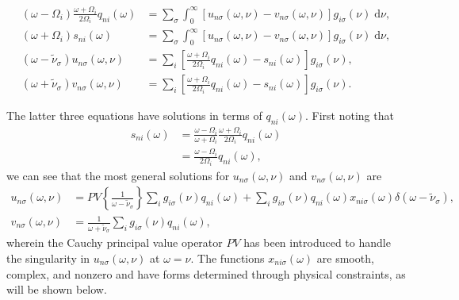 \begin{equation}\label{eq:hybridizationCoefficientsSystemManyModes}
\begin{split}
(\omega - \Omega_i)\frac{\omega + \Omega_i}{2\Omega_i}q_{ni}(\omega) &= \sum_\sigma\int_0^\infty\left[u_{n\sigma}(\omega,\nu) - v_{n\sigma}(\omega,\nu)\right]g_{i\sigma}(\nu)\;\mathrm{d}\nu,\\
(\omega + \Omega_i)s_{ni}(\omega) &= \sum_\sigma\int_0^\infty\left[u_{n\sigma}(\omega,\nu) - v_{n\sigma}(\omega,\nu)\right]g_{i\sigma}(\nu)\;\mathrm{d}\nu,\\
(\omega - \tilde{\nu}_\sigma)u_{n\sigma}(\omega,\nu) &= \sum_i\left[\frac{\omega + \Omega_i}{2\Omega_i}q_{ni}(\omega) - s_{ni}(\omega)\right]g_{i\sigma}(\nu),\\
(\omega + \tilde{\nu}_\sigma)v_{n\sigma}(\omega,\nu) &= \sum_i\left[\frac{\omega + \Omega_i}{2\Omega_i}q_{ni}(\omega) - s_{ni}(\omega)\right]g_{i\sigma}(\nu).
\end{split}
\end{equation}

The latter three equations have solutions in terms of $q_{ni}(\omega)$. First noting that
\begin{equation}
\begin{split}
s_{ni}(\omega) &= \frac{\omega - \Omega_i}{\omega + \Omega_i}\frac{\omega + \Omega_i}{2\Omega_i}q_{ni}(\omega)\\
&= \frac{\omega - \Omega_i}{2\Omega_i}q_{ni}(\omega),
\end{split}
\end{equation}
we can see that the most general solutions for $u_{n\sigma}(\omega,\nu)$ and $v_{n\sigma}(\omega,\nu)$ are
\begin{equation}
\begin{split}
u_{n\sigma}(\omega,\nu) &= PV\left\{\frac{1}{\omega - \tilde{\nu}_\sigma}\right\}\sum_ig_{i\sigma}(\nu)q_{ni}(\omega) + \sum_ig_{i\sigma}(\nu)q_{ni}(\omega)x_{ni\sigma}(\omega)\delta(\omega - \tilde{\nu}_\sigma),\\
v_{n\sigma}(\omega,\nu) &= \frac{1}{\omega + \tilde{\nu}_\sigma}\sum_ig_{i\sigma}(\nu)q_{ni}(\omega),
\end{split}
\end{equation}
wherein the Cauchy principal value operator $PV$ has been introduced to handle the singularity in $u_{n\sigma}(\omega,\nu)$ at $\omega = \nu$. The functions $x_{ni\sigma}(\omega)$ are smooth, complex, and nonzero and have forms determined through physical constraints, as will be shown below. 


